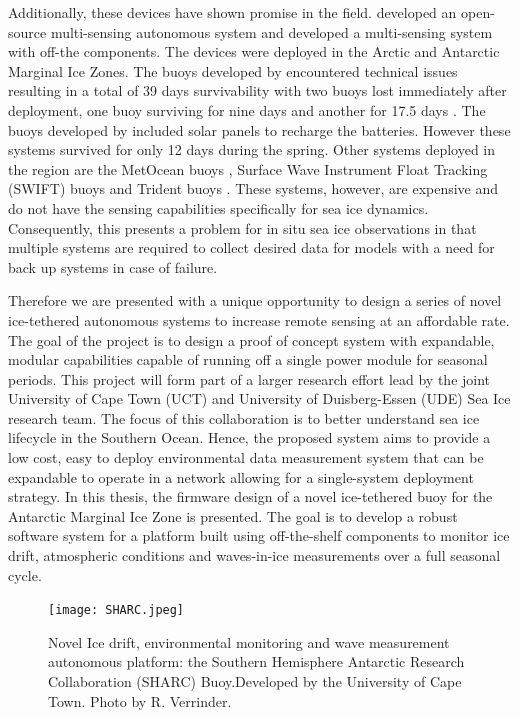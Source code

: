 Additionally, these devices have shown promise in the field. \textcite{rabault2019open} developed an open-source multi-sensing autonomous system and \textcite{kohout2015device} developed a multi-sensing system with off-the components. The devices were deployed in the Arctic and Antarctic Marginal Ice Zones. The buoys developed by \textcite{kohout2015device} encountered technical issues resulting in a total of 39 days survivability with two buoys lost immediately after deployment, one buoy surviving for nine days and another for 17.5 days \cite{kohout2015device}. The buoys developed by \textcite{rabault2019open}  included solar panels to recharge the batteries. However these systems survived for only 12 days during the spring.  Other systems deployed in the region are the MetOcean buoys \cite{uptempo}, Surface Wave Instrument Float Tracking (SWIFT) \cite{thomson2012wave} buoys and Trident buoys \cite{trident}. These systems, however, are expensive and do not have the sensing capabilities specifically for sea ice dynamics. Consequently, this presents a problem for in situ sea ice observations in that multiple systems are required to collect desired data for models with a need for back up systems in case of failure. 

Therefore we are presented with a unique opportunity to design a series of novel ice-tethered autonomous systems to increase remote sensing at an affordable rate. The goal of the project is to design a proof of concept system with expandable, modular capabilities capable of running off a single power module for seasonal periods. This project will form part of a larger research effort lead by the joint University of Cape Town (UCT) and University of Duisberg-Essen (UDE) Sea Ice research team. The focus of this collaboration is to better understand sea ice lifecycle in the Southern Ocean. Hence, the proposed system aims to provide a low cost, easy to deploy environmental data measurement system that can be expandable to operate in a network allowing for a single-system deployment strategy. In this thesis, the firmware design of a novel ice-tethered buoy for the Antarctic Marginal Ice Zone is presented. The goal is to develop a robust software system  for a platform built using off-the-shelf components to monitor ice drift, atmospheric conditions and waves-in-ice measurements over a full seasonal cycle.

\begin{figure}[H]
    \centering
    \texttt{[image: SHARC.jpeg]}
    \caption{Novel Ice drift, environmental monitoring and wave measurement autonomous platform: the Southern Hemisphere Antarctic Research Collaboration (SHARC) Buoy.Developed by the University of Cape Town. Photo by R. Verrinder.}
    \label{fig:chapter1_sharc_buoy}
\end{figure}


